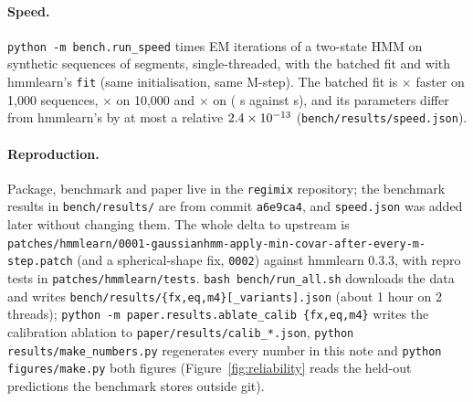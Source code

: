 \documentclass{article}
\begin{document}
\paragraph{Speed.}
\texttt{python -m bench.run\_speed} times \nSpeedIter{} EM iterations of a two-state HMM on synthetic sequences of \nSpeedSeg{} segments, single-threaded, with the batched fit and with hmmlearn's \texttt{fit} (same initialisation, same M-step).
The batched fit is \nSpeedA$\times$ faster on 1,000 sequences, \nSpeedB$\times$ on 10,000 and \nSpeedC$\times$ on \nSpeedNC{} (\nSpeedTimeC{} s against \nSpeedTimeHC{} s), and its parameters differ from hmmlearn's by at most a relative $2.4\times10^{-13}$ (\texttt{bench/results/speed.json}).

\paragraph{Reproduction.}
Package, benchmark and paper live in the \texttt{regimix} repository; the benchmark results in \texttt{bench/results/} are from commit \texttt{a6e9ca4}, and \texttt{speed.json} was added later without changing them.
The whole delta to upstream is \texttt{patches/hmmlearn/0001-gaussianhmm-apply-min-covar-after-every-m-step.patch} (and a spherical-shape fix, \texttt{0002}) against hmmlearn 0.3.3, with repro tests in \texttt{patches/hmmlearn/tests}.
\texttt{bash bench/run\_all.sh} downloads the data and writes \texttt{bench/results/\{fx,eq,m4\}[\_variants].json} (about 1 hour on 2 threads);
\texttt{python -m paper.results.ablate\_calib \{fx,eq,m4\}} writes the calibration ablation to \texttt{paper/results/calib\_*.json}, \texttt{python results/make\_numbers.py} regenerates every number in this note and \texttt{python figures/make.py} both figures (Figure~\ref{fig:reliability} reads the held-out predictions the benchmark stores outside git).
\end{document}
